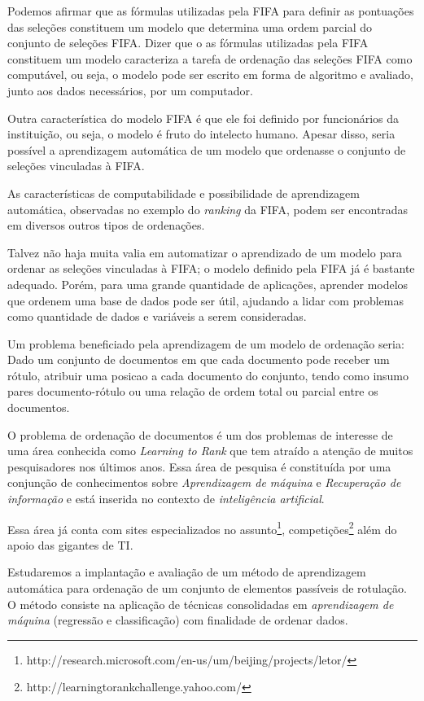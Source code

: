 Podemos afirmar que as fórmulas utilizadas pela FIFA para definir as pontuações das seleções constituem um modelo que determina uma ordem parcial do conjunto de seleções FIFA. Dizer que o as fórmulas utilizadas pela FIFA constituem um modelo caracteriza a tarefa de ordenação das seleções FIFA como computável, ou seja, o modelo pode ser escrito em forma de algoritmo e avaliado, junto aos dados necessários, por um computador.

Outra característica do modelo FIFA é que ele foi definido por funcionários da instituição, ou seja, o modelo é fruto do intelecto humano. Apesar disso, seria possível a aprendizagem automática de um modelo que ordenasse o conjunto de seleções vinculadas à FIFA.

As características de computabilidade e possibilidade de aprendizagem automática, observadas no exemplo do \emph{ranking} da FIFA, podem ser encontradas em diversos outros tipos de ordenações.

Talvez não haja muita valia em automatizar o aprendizado de um modelo para ordenar as seleções vinculadas à FIFA; o modelo definido pela FIFA já é bastante adequado. Porém, para uma grande quantidade de aplicações, aprender modelos que ordenem uma base de dados pode ser útil, ajudando a lidar com problemas como quantidade de dados e variáveis a serem consideradas.

Um problema beneficiado pela aprendizagem de um modelo de ordenação seria: Dado um conjunto de documentos em que cada documento pode receber um rótulo, atribuir uma posicao a cada documento do conjunto, tendo como insumo pares documento-rótulo ou uma relação de ordem total ou parcial entre os documentos.

O problema de ordenação de documentos é um dos problemas de interesse de uma área  conhecida como \emph{Learning to Rank} que tem atraído a atenção de muitos pesquisadores nos últimos anos. Essa área de pesquisa é constituída por uma conjunção de conhecimentos sobre \emph{Aprendizagem de máquina} e \emph{Recuperação de informação} e está inserida no contexto de \emph{inteligência artificial}.

Essa área já conta com sites especializados no assunto\footnote{http://research.microsoft.com/en-us/um/beijing/projects/letor/}, competições\footnote{http://learningtorankchallenge.yahoo.com/} além do apoio das gigantes de TI.

Estudaremos a implantação e avaliação de um método de aprendizagem automática para ordenação de um conjunto de elementos passíveis de rotulação. O método consiste na aplicação de técnicas consolidadas em \emph{aprendizagem de máquina} (regressão e classificação) com finalidade de ordenar dados.